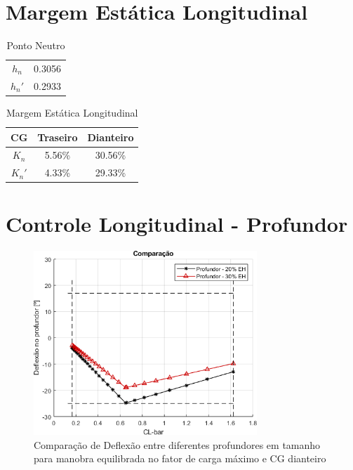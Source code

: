 \section{Margem Estática Longitudinal}
\label{margem}


\begin{table}[H]
\centering
\begin{tabular}{cc}
\toprule
$ h_n $ & 0.3056 \\
$ h_n' $ & 0.2933 \\
\bottomrule
\end{tabular}
\caption[Ponto Neutro]{Ponto Neutro}
\label{tbl:ponto_neutro}
\end{table}

\begin{table}[H]
\centering
\begin{tabular}{ccc}
\toprule
CG & Traseiro & Dianteiro \\ \midrule
$ K_n $ & 5.56\% & 30.56\% \\
$ K_n' $ & 4.33\% & 29.33\% \\
\bottomrule
\end{tabular}
\caption[Margem Estática Longitudinal]{Margem Estática Longitudinal}
\label{tbl:margem_estatica}
\end{table}

\section{Controle Longitudinal - Profundor}
\label{controlelongitudinal}

\begin{figure}[H]
\centering
\includegraphics[width=0.75\textwidth]{images/parte3/comparacao_deflexao.png}
\caption[Comparação de Deflexão entre diferentes profundores em tamanho para manobra equilibrada]{Comparação de Deflexão entre diferentes profundores em tamanho para manobra equilibrada no fator de carga máximo e CG dianteiro}
\label{fig:comp_def}
\end{figure}


